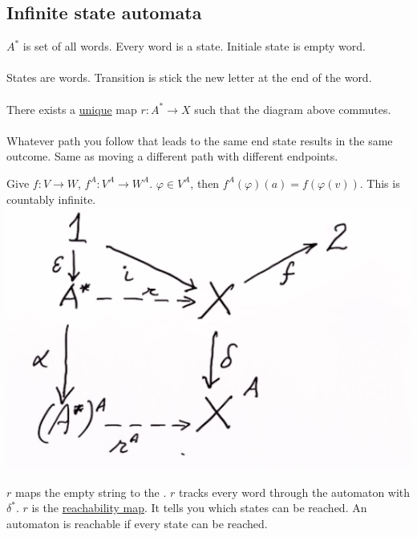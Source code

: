 \documentclass[class=scrartcl, crop=false]{standalone}
\begin{document}
\subsection{Infinite state automata}
$A^*$ is set of all words. Every word is a state. Initiale state is empty word.
\\\\
States are words. Transition is stick the new letter at the end of the word.
\\\\
There exists a \ul{unique} map $r: A^* \to X$ such that the diagram above commutes.
\\\\
Whatever path you follow that leads to the same end state results in the same outcome. Same as moving a different path with different endpoints.
\begin{note}
  Give $f: V \to W$, $f^A: V^A \to W^A$. $\varphi \in V^A$, then $f^A(\varphi)(a) = f(\varphi(v))$. This is countably infinite.
  \includegraphics[width=\textwidth]{thisisanautomaton2}
  \begin{definition}[Reachability]
    $r$ maps the empty string to the . $r$ tracks every word through the automaton with $\delta^*$. $r$ is the \ul{reachability map}. It tells you which states can be reached. An automaton is reachable if every state can be reached.
  \end{definition} 
\end{note} 
\end{document}
